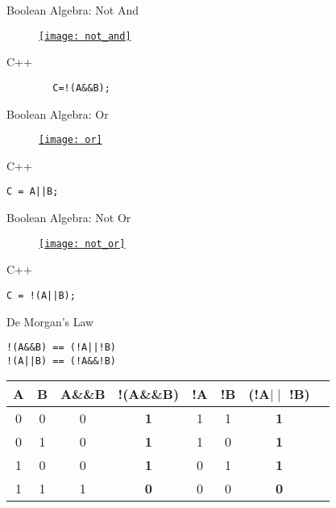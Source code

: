 \documentclass[xcolor={dvipsnames}]{beamer}
\begin{document}
\begin{frame}[fragile]{Boolean Algebra: Not And}
\begin{figure}
		\href{http://www.daviddarling.info/encyclopedia/B/Boolean_algebra.html}{\texttt{[image: not\_and]}}
	\end{figure}
	\pause
	\begin{block}{C++}
\Huge
		\begin{verbatim}
		C=!(A&&B);
		\end{verbatim}
	\end{block}

\end{frame}

\begin{frame}[fragile]{Boolean Algebra: Or}
\begin{figure}
		\href{http://www.daviddarling.info/encyclopedia/B/Boolean_algebra.html}{\texttt{[image: or]}}
\end{figure}
\pause
	\begin{block}{C++}
\Huge
\begin{verbatim}
C = A||B;
\end{verbatim}
	\end{block}
\end{frame}

\begin{frame}[fragile]{Boolean Algebra: Not Or}
\begin{figure}
		\href{http://www.daviddarling.info/encyclopedia/B/Boolean_algebra.html}{\texttt{[image: not\_or]}}
	\end{figure}
	\pause
	\begin{block}{C++}
\Huge
\begin{verbatim}
C = !(A||B);
\end{verbatim}
	\end{block}
\end{frame}

\begin{frame}[fragile]{De Morgan's Law}
\Huge
\begin{center}
\begin{verbatim}
!(A&&B) == (!A||!B)
!(A||B) == (!A&&!B)
\end{verbatim}
\end{center}
\begin{block}{}
\Large
\begin{center}
\begin{tabular}{|c|c|c|c|c|c|c|c|}
\hline
A & B & A\&\&B & \textbf{!(A\&\&B)} & !A & !B &\textbf{(!A$\mid \mid$ !B)} \\
\hline
0 & 0 & 0 & \textbf{1} & 1 & 1 &  \textbf{1}\\
\hline
0 & 1 & 0 & \textbf{1} & 1 & 0 & \textbf{1}\\
\hline
1 & 0 & 0 & \textbf{1} & 0 & 1 & \textbf{1} \\
\hline
1 & 1 & 1 & \textbf{0} & 0 & 0  & \textbf{0} \\
\hline
\end{tabular}
\end{center}
\end{block}
\end{frame}
\end{document}
